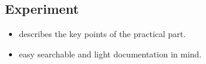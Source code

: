 \subsection{Experiment}

\begin{itemize}
	\item describes the key points of the practical part.
	\item easy searchable and light documentation in mind.
\end{itemize}